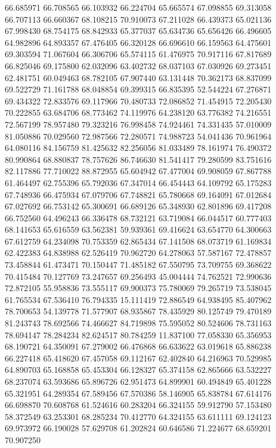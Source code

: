 66.685971
66.708565
66.103932
66.224704
65.665574
67.098855
69.313058
66.707113
66.660367
68.108215
70.910073
67.211028
66.439373
65.021136
67.998430
68.754175
68.842933
65.377037
65.634736
65.656426
66.496605
64.982896
64.893357
67.476405
66.320128
66.696610
66.159563
64.475601
69.303594
71.067604
66.306706
65.574115
61.476975
70.917116
67.817689
66.825046
69.175800
62.032096
63.402732
68.037103
67.030926
69.273451
62.481751
60.049463
68.782105
67.907440
63.131448
70.362173
68.837099
69.522729
71.161788
68.048854
69.399315
66.835395
52.544224
67.276871
69.434322
72.833576
69.117966
70.480733
72.086852
71.454915
72.205430
70.222855
63.684706
68.773462
74.119976
64.238120
63.776382
74.216551
72.567199
78.957480
79.323216
76.998458
74.924461
74.331435
57.010009
81.050886
70.029560
72.987566
72.280571
74.988723
54.041436
70.961964
64.080116
84.156759
81.425632
82.256056
81.033489
78.161974
76.490372
80.990864
68.880837
78.757626
86.746630
81.541417
79.280599
83.751616
82.117886
77.710022
88.872955
65.604942
67.477004
69.908059
67.867788
61.464497
62.755396
65.792036
67.347014
66.454443
64.109792
65.175283
67.748936
66.475934
67.079706
67.748821
65.780668
69.164091
67.012684
67.027692
66.753142
65.300691
66.689126
65.348930
62.801896
69.417208
66.752560
64.496243
66.336478
68.732121
63.719084
66.044517
60.777403
68.141653
65.616559
63.562381
59.939361
69.416624
63.654770
64.300663
67.612759
64.234098
70.753359
62.865434
67.141508
68.073719
61.169834
62.422383
64.838988
62.526419
70.962720
64.278063
57.587167
72.478857
73.458844
61.473471
70.150447
71.485182
67.550795
73.709755
69.368622
70.415484
70.127769
73.247657
69.256493
45.004444
74.762521
72.990636
72.872105
55.958836
73.555117
69.900373
75.780069
79.265719
73.538045
61.765534
67.536410
76.794335
15.111419
72.886549
64.938495
85.407962
78.700653
54.139778
71.577907
68.935867
78.435929
80.125749
79.470189
81.243743
78.692566
74.466627
84.719898
75.595052
80.524606
78.731163
78.694147
78.284234
82.624517
80.784259
11.837100
77.058330
65.356953
68.190721
64.350091
67.279002
66.476868
66.633622
63.019618
65.886238
66.227418
65.418620
67.457058
69.112167
62.402840
64.216963
70.529985
64.890703
65.168858
65.453304
66.128327
65.374158
62.865666
63.532227
68.237074
63.593686
65.896726
62.951473
64.899901
60.494849
65.401228
65.321951
64.289354
67.589456
67.570386
58.146905
65.838784
67.614176
66.698870
70.608768
61.524616
60.283204
66.324155
59.912790
57.153480
58.372549
63.253301
68.285234
70.412770
64.324155
63.611111
69.124123
69.973972
66.190028
57.629708
61.202824
60.646586
71.224677
68.659201
70.907250
